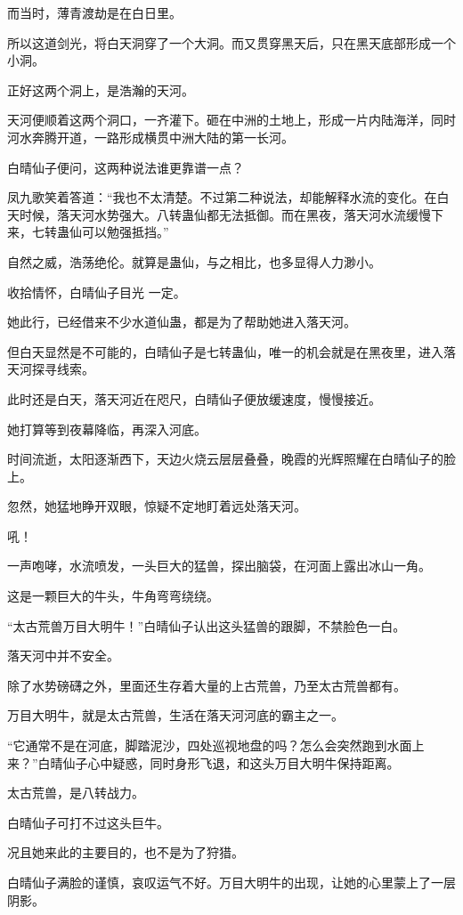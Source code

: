 \begin{this_body}
而当时，薄青渡劫是在白日里。

所以这道剑光，将白天洞穿了一个大洞。而又贯穿黑天后，只在黑天底部形成一个小洞。

正好这两个洞上，是浩瀚的天河。

天河便顺着这两个洞口，一齐灌下。砸在中洲的土地上，形成一片内陆海洋，同时河水奔腾开道，一路形成横贯中洲大陆的第一长河。

白晴仙子便问，这两种说法谁更靠谱一点？

凤九歌笑着答道：“我也不太清楚。不过第二种说法，却能解释水流的变化。在白天时候，落天河水势强大。八转蛊仙都无法抵御。而在黑夜，落天河水流缓慢下来，七转蛊仙可以勉强抵挡。”

自然之威，浩荡绝伦。就算是蛊仙，与之相比，也多显得人力渺小。

收拾情怀，白晴仙子目光 一定。

她此行，已经借来不少水道仙蛊，都是为了帮助她进入落天河。

但白天显然是不可能的，白晴仙子是七转蛊仙，唯一的机会就是在黑夜里，进入落天河探寻线索。

此时还是白天，落天河近在咫尺，白晴仙子便放缓速度，慢慢接近。

她打算等到夜幕降临，再深入河底。

时间流逝，太阳逐渐西下，天边火烧云层层叠叠，晚霞的光辉照耀在白晴仙子的脸上。

忽然，她猛地睁开双眼，惊疑不定地盯着远处落天河。

吼！

一声咆哮，水流喷发，一头巨大的猛兽，探出脑袋，在河面上露出冰山一角。

这是一颗巨大的牛头，牛角弯弯绕绕。

“太古荒兽万目大明牛！”白晴仙子认出这头猛兽的跟脚，不禁脸色一白。

落天河中并不安全。

除了水势磅礴之外，里面还生存着大量的上古荒兽，乃至太古荒兽都有。

万目大明牛，就是太古荒兽，生活在落天河河底的霸主之一。

“它通常不是在河底，脚踏泥沙，四处巡视地盘的吗？怎么会突然跑到水面上来？”白晴仙子心中疑惑，同时身形飞退，和这头万目大明牛保持距离。

太古荒兽，是八转战力。

白晴仙子可打不过这头巨牛。

况且她来此的主要目的，也不是为了狩猎。

白晴仙子满脸的谨慎，哀叹运气不好。万目大明牛的出现，让她的心里蒙上了一层阴影。


\end{this_body}
